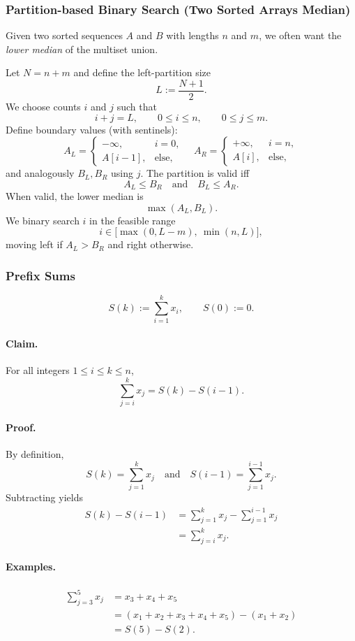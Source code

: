 \documentclass{article}
\begin{document}
\subsubsection{Partition-based Binary Search (Two Sorted Arrays Median)}
Given two sorted sequences \(A\) and \(B\) with lengths \(n\) and \(m\), we often want the
\emph{lower median} of the multiset union.

Let \(N=n+m\) and define the left-partition size
\[
L := \frac{N+1}{2}.
\]
We choose counts \(i\) and \(j\) such that
\[
i+j=L,
\qquad 0 \le i \le n,
\qquad 0 \le j \le m.
\]
Define boundary values (with sentinels):
\[
A_L =
\begin{cases}
-\infty, & i=0,\\
A[i-1], & \text{else},
\end{cases}
\quad
A_R =
\begin{cases}
+\infty, & i=n,\\
A[i], & \text{else},
\end{cases}
\]
and analogously \(B_L, B_R\) using \(j\).
The partition is valid iff
\[
A_L \le B_R
\quad\text{and}\quad
B_L \le A_R.
\]
When valid, the lower median is
\[
\max(A_L, B_L).
\]
We binary search \(i\) in the feasible range
\[
i \in \bigl[\max(0, L-m),\ \min(n, L)\bigr],
\]
moving left if \(A_L > B_R\) and right otherwise.

\subsubsection{Prefix Sums}
\[
S(k)
:= \sum_{i=1}^{k} x_i,
\qquad
S(0) := 0.
\]

\paragraph{Claim.}
For all integers \( 1 \le i \le k \le n \),
\[
\sum_{j=i}^{k} x_j
= S(k) - S(i-1).
\]

\paragraph{Proof.}
By definition,
\[
S(k) = \sum_{j=1}^{k} x_j
\quad \text{and} \quad
S(i-1) = \sum_{j=1}^{i-1} x_j.
\]
Subtracting yields
\begin{align}
S(k) - S(i-1)
&= \sum_{j=1}^{k} x_j - \sum_{j=1}^{i-1} x_j \\[6pt]
&= \sum_{j=i}^{k} x_j.
\end{align}

\paragraph{Examples.}
\begin{align*}
\sum_{j=3}^{5} x_j
&= x_3 + x_4 + x_5 \\[6pt]
&= \left( x_1 + x_2 + x_3 + x_4 + x_5 \right)
 - \left( x_1 + x_2 \right) \\[6pt]
&= S(5) - S(2).
\end{align*}
\end{document}
